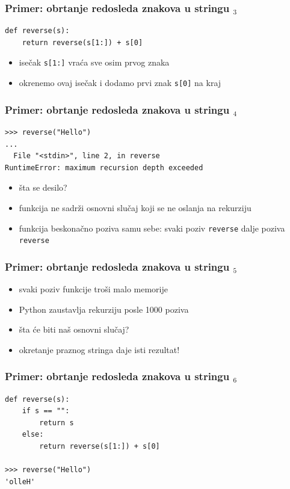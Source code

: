 \documentclass[utf8,compress]{beamer}
\begin{document}
\begin{frame}[fragile]
  \frametitle{Primer: obrtanje redosleda znakova u stringu $_3$}
\begin{verbatim}
def reverse(s):
    return reverse(s[1:]) + s[0]
\end{verbatim}
  \begin{itemize}
    \item isečak \texttt{s[1:]} vraća sve osim prvog znaka
    \item okrenemo ovaj isečak i dodamo prvi znak \texttt{s[0]} na kraj 
  \end{itemize}
\end{frame}

\begin{frame}[fragile]
  \frametitle{Primer: obrtanje redosleda znakova u stringu $_4$}
\begin{verbatim}
>>> reverse("Hello")
...
  File "<stdin>", line 2, in reverse
RuntimeError: maximum recursion depth exceeded
\end{verbatim}
  \begin{itemize}
    \item šta se desilo?
    \item funkcija ne sadrži osnovni slučaj koji se ne oslanja na rekurziju
    \item funkcija beskonačno poziva samu sebe: svaki poziv \texttt{reverse} dalje poziva \texttt{reverse}
  \end{itemize}
\end{frame}

\begin{frame}[fragile]
  \frametitle{Primer: obrtanje redosleda znakova u stringu $_5$}
  \begin{itemize}
    \item svaki poziv funkcije troši malo memorije
    \item Python zaustavlja rekurziju posle 1000 poziva
    \item šta će biti naš osnovni slučaj?
    \item okretanje praznog stringa daje isti rezultat!
  \end{itemize}
\end{frame}

\begin{frame}[fragile]
  \frametitle{Primer: obrtanje redosleda znakova u stringu $_6$}
\begin{verbatim}
def reverse(s):
    if s == "":
        return s
    else:
        return reverse(s[1:]) + s[0]

>>> reverse("Hello")
'olleH'
\end{verbatim}
\end{frame}
\end{document}
